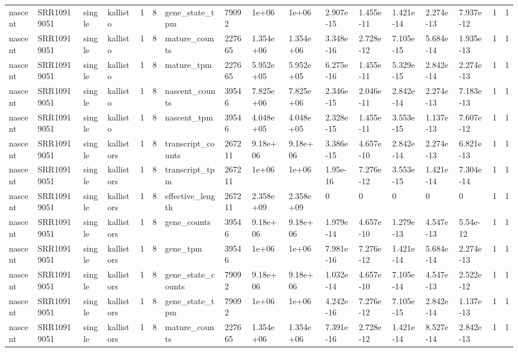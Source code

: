 \begin{tabular}{lllllllllllllllll}
nascent & SRR10919051 & single & kallisto & 1 & 8 & gene\_state\_tpm & 79092 & 1e+06 & 1e+06 & 2.907e-15 & 1.455e-11 & 1.421e-14 & 2.274e-13 & 7.937e-12 & 1 & 1 \\
nascent & SRR10919051 & single & kallisto & 1 & 8 & mature\_counts & 227665 & 1.354e+06 & 1.354e+06 & 3.348e-16 & 2.728e-12 & 7.105e-15 & 5.684e-14 & 1.935e-13 & 1 & 1 \\
nascent & SRR10919051 & single & kallisto & 1 & 8 & mature\_tpm & 227665 & 5.952e+05 & 5.952e+05 & 6.275e-16 & 1.455e-11 & 5.329e-15 & 2.842e-14 & 2.274e-13 & 1 & 1 \\
nascent & SRR10919051 & single & kallisto & 1 & 8 & nascent\_counts & 39546 & 7.825e+06 & 7.825e+06 & 2.346e-15 & 2.046e-11 & 2.842e-14 & 2.274e-13 & 7.183e-13 & 1 & 1 \\
nascent & SRR10919051 & single & kallisto & 1 & 8 & nascent\_tpm & 39546 & 4.048e+05 & 4.048e+05 & 2.328e-15 & 1.455e-11 & 3.553e-15 & 1.137e-13 & 7.607e-12 & 1 & 1 \\
nascent & SRR10919051 & single & kallistors & 1 & 8 & transcript\_counts & 267211 & 9.18e+06 & 9.18e+06 & 3.386e-15 & 4.657e-10 & 2.842e-14 & 2.274e-13 & 6.821e-13 & 1 & 1 \\
nascent & SRR10919051 & single & kallistors & 1 & 8 & transcript\_tpm & 267211 & 1e+06 & 1e+06 & 1.95e-16 & 7.276e-12 & 3.553e-15 & 1.421e-14 & 7.304e-14 & 1 & 1 \\
nascent & SRR10919051 & single & kallistors & 1 & 8 & effective\_length & 267211 & 2.358e+09 & 2.358e+09 & 0 & 0 & 0 & 0 & 0 & 1 & 1 \\
nascent & SRR10919051 & single & kallistors & 1 & 8 & gene\_counts & 39546 & 9.18e+06 & 9.18e+06 & 1.979e-14 & 4.657e-10 & 1.279e-13 & 4.547e-13 & 5.54e-12 & 1 & 1 \\
nascent & SRR10919051 & single & kallistors & 1 & 8 & gene\_tpm & 39546 & 1e+06 & 1e+06 & 7.981e-16 & 7.276e-12 & 1.421e-14 & 5.684e-14 & 2.274e-13 & 1 & 1 \\
nascent & SRR10919051 & single & kallistors & 1 & 8 & gene\_state\_counts & 79092 & 9.18e+06 & 9.18e+06 & 1.032e-14 & 4.657e-10 & 7.105e-14 & 4.547e-13 & 2.522e-12 & 1 & 1 \\
nascent & SRR10919051 & single & kallistors & 1 & 8 & gene\_state\_tpm & 79092 & 1e+06 & 1e+06 & 4.242e-16 & 7.276e-12 & 7.105e-15 & 2.842e-14 & 1.137e-13 & 1 & 1 \\
nascent & SRR10919051 & single & kallistors & 1 & 8 & mature\_counts & 227665 & 1.354e+06 & 1.354e+06 & 7.391e-16 & 2.728e-12 & 1.421e-14 & 8.527e-14 & 2.842e-13 & 1 & 1 \\

\end{tabular}
